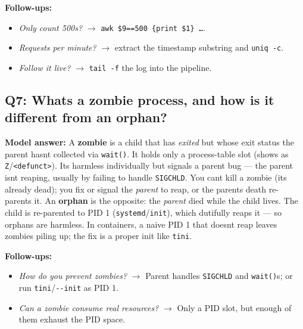 \documentclass[11pt]{article}
\providecommand{\tightlist}{\setlength{\itemsep}{1pt}\setlength{\parskip}{0pt}}
\begin{document}
\textbf{Follow-ups:}

\begin{itemize}
\tightlist
\item
  \emph{Only count 500s?} \(\rightarrow\) \texttt{awk\ \textquotesingle{}\$9==500\ \{print\ \$1\}\textquotesingle{}\ …}.
\item
  \emph{Requests per minute?} \(\rightarrow\) extract the timestamp substring and \texttt{uniq\ -c}.
\item
  \emph{Follow it live?} \(\rightarrow\) \texttt{tail\ -f} the log into the pipeline.
\end{itemize}

\subsection{Q7: What\textquotesingle s a zombie process, and how is it different from an orphan?}\label{q7-whats-a-zombie-process-and-how-is-it-different-from-an-orphan}

\textbf{Model answer:} A \textbf{zombie} is a child that has \emph{exited} but whose exit status the parent hasn\textquotesingle t collected via \texttt{wait()}. It holds only a process-table slot (shows as \texttt{Z}/\texttt{\textless{}defunct\textgreater{}}). It\textquotesingle s harmless individually but signals a parent bug --- the parent isn\textquotesingle t reaping, usually by failing to handle \texttt{SIGCHLD}. You can\textquotesingle t kill a zombie (it\textquotesingle s already dead); you fix or signal the \emph{parent} to reap, or the parent\textquotesingle s death re-parents it. An \textbf{orphan} is the opposite: the \emph{parent} died while the child lives. The child is re-parented to PID 1 (\texttt{systemd}/\texttt{init}), which dutifully reaps it --- so orphans are harmless. In containers, a naive PID 1 that doesn\textquotesingle t reap leaves zombies piling up; the fix is a proper init like \texttt{tini}.

\textbf{Follow-ups:}

\begin{itemize}
\tightlist
\item
  \emph{How do you prevent zombies?} \(\rightarrow\) Parent handles \texttt{SIGCHLD} and \texttt{wait()}s; or run \texttt{tini}/\texttt{-\/-init} as PID 1.
\item
  \emph{Can a zombie consume real resources?} \(\rightarrow\) Only a PID slot, but enough of them exhaust the PID space.
\end{itemize}
\end{document}

